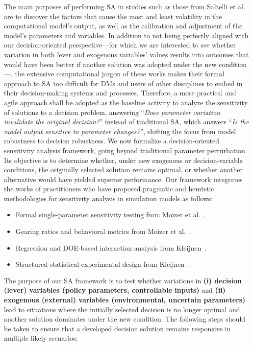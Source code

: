 \documentclass{sfuthesis}
\begin{document}
The main purposes of performing SA in studies such as those from Saltelli et al.~\cite{saltelli2000sensitivity,saltelli2008global} are to discover the factors that cause the most and least volatility in the computational model’s output, as well as the calibration and adjustment of the model’s parameters and variables. In addition to not being perfectly aligned with our decision-oriented perspective—for which we are interested to see whether variation in both lever and exogenous variables’ values results into outcomes that would have been better if another solution was adopted under the new condition—, the extensive computational jargon of these works makes their formal approach to SA too difficult for DMs and users of other disciplines to embed in their decision-making systems and processes. Therefore, a more practical and agile approach shall be adopted as the baseline activity to analyze the sensitivity of solutions to a decision problem, answering “\textit{Does parameter variation invalidate the original decision?}” instead of traditional SA, which answers “\textit{Is the model output sensitive to parameter changes?}”, shifting the focus from model robustness to decision robustness. We now formalize a decision-oriented sensitivity analysis framework, going beyond traditional parameter perturbation. Its objective is to determine whether, under new exogenous or decision-variable conditions, the originally selected solution remains optimal, or whether another alternative would have yielded superior performance. Our framework integrates the works of practitioners who have proposed pragmatic and heuristic methodologies for sensitivity analysis in simulation models as follows:
\begin{itemize}
    \item Formal single-parameter sensitivity testing from Moizer et al.~\cite{moizer2001formal}.
    \item Gearing ratios and behavioral metrics from Moizer et al.~\cite{moizer2001formal}.
    \item Regression and DOE-based interaction analysis from Kleijnen~\cite{kleijnen1995sensitivity}. 
    \item Structured statistical experimental design from Kleijnen~\cite{kleijnen1995sensitivity}.
\end{itemize}
The purpose of our SA framework is to test whether variations in \textbf{(i) decision (lever) variables (policy parameters, controllable inputs)} and \textbf{(ii) exogenous (external) variables (environmental, uncertain parameters)} lead to situations where the initially selected decision is no longer optimal and another solution dominates under the new condition. The following steps should be taken to ensure that a developed decision solution remains responsive in multiple likely scenarios:\par
\end{document}

